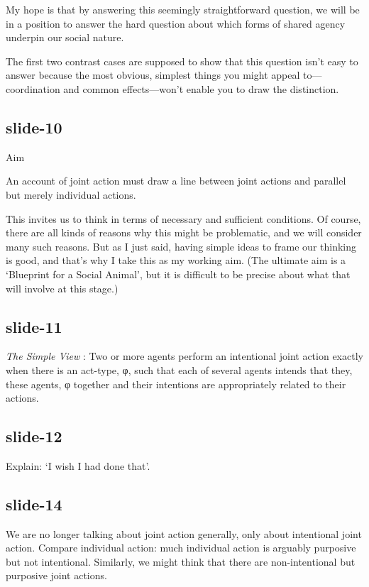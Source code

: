\documentclass[12pt,\papersize]{extarticle}
\begin{document}
My hope is that by answering this seemingly straightforward question, we will be
in a position to answer the hard question about which forms of shared agency
underpin our social nature.

The first two contrast cases are supposed to show that this question isn’t easy
to answer because the most obvious, simplest things you might appeal to---coordination
and common effects---won’t enable you to draw the distinction.

\subsection{slide-10}
Aim



An account of joint action must draw a line between joint actions and parallel but
merely individual actions.



This invites us to think in terms of necessary and sufficient conditions.
Of course, there are all kinds of reasons why this might be problematic, and we
will consider many such reasons.
But as I just said, having simple ideas to frame our thinking is good, and that’s why
I take this as my working aim.
(The ultimate aim is a ‘Blueprint for a Social Animal’, but it is difficult to be
precise about what that will involve at this stage.)

\subsection{slide-11}
\emph{The Simple View}
:
Two or more agents perform an intentional joint action exactly when there is an act-type, φ, such that each of several agents intends that they, these agents, φ  together and their intentions are  appropriately related  to their actions.


\subsection{slide-12}
Explain: ‘I wish I had done that’.

\subsection{slide-14}
We are no longer talking about joint action generally, only about intentional joint action.
Compare individual action: much individual action is arguably purposive but not
intentional.  Similarly, we might think that there are non-intentional but purposive joint
actions.
\end{document}
